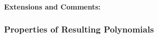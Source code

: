 \textbf{Extensions and Comments:}


\subsubsection{Properties of Resulting Polynomials}
















